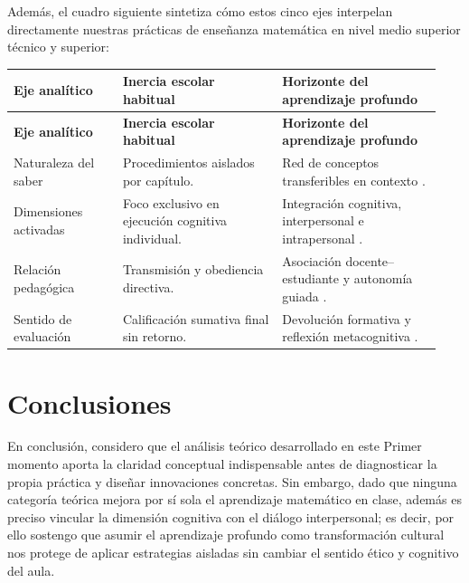 \documentclass[spanish,letterpaper,oneside]{article}
\begin{document}
Además, el cuadro siguiente sintetiza cómo estos cinco ejes interpelan directamente nuestras prácticas de enseñanza matemática en nivel medio superior técnico y superior:

{\small{}\renewcommand{\arraystretch}{1.3}
\begin{longtable}{|>{\raggedright\arraybackslash}p{0.24\linewidth}|>{\raggedright\arraybackslash}p{0.35\linewidth}|>{\raggedright\arraybackslash}p{0.35\linewidth}|}\hline
\rowcolor{iiiepePale} \textbf{Eje analítico} & \textbf{Inercia escolar habitual} & \textbf{Horizonte del aprendizaje profundo} \\\hline
\endfirsthead
\hline
\rowcolor{iiiepePale} \textbf{Eje analítico} & \textbf{Inercia escolar habitual} & \textbf{Horizonte del aprendizaje profundo} \\\hline
\endhead
Naturaleza del saber & Procedimientos aislados por capítulo. & Red de conceptos transferibles en contexto \citep{sawyer2008optimizing}. \\\hline
Dimensiones activadas & Foco exclusivo en ejecución cognitiva individual. & Integración cognitiva, interpersonal e intrapersonal \citep{quiroga2022aprendizaje}. \\\hline
Relación pedagógica & Transmisión y obediencia directiva. & Asociación docente--estudiante y autonomía guiada \citep{fullan2014rich}. \\\hline
Sentido de evaluación & Calificación sumativa final sin retorno. & Devolución formativa y reflexión metacognitiva \citep{eef2021feedback}. \\\hline
\end{longtable}}

\clearpage
\section{Conclusiones}
En conclusión, considero que el análisis teórico desarrollado en este Primer momento aporta la claridad conceptual indispensable antes de diagnosticar la propia práctica y diseñar innovaciones concretas. Sin embargo, dado que ninguna categoría teórica mejora por sí sola el aprendizaje matemático en clase, además es preciso vincular la dimensión cognitiva con el diálogo interpersonal; es decir, por ello sostengo que asumir el aprendizaje profundo como transformación cultural nos protege de aplicar estrategias aisladas sin cambiar el sentido ético y cognitivo del aula.
\end{document}
